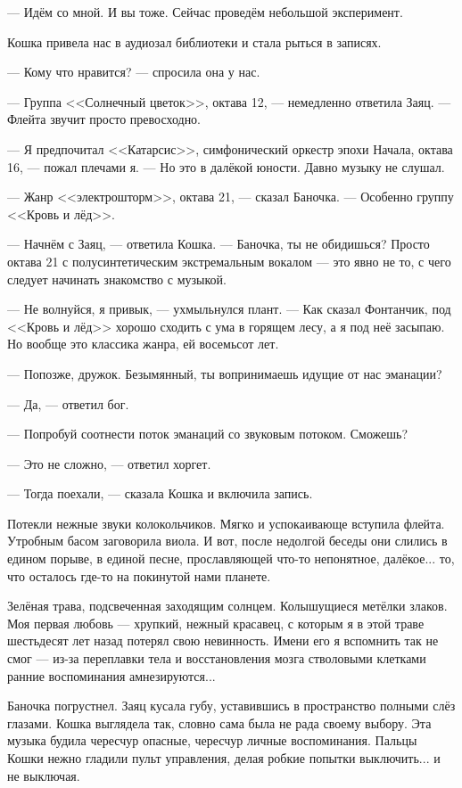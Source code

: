 --- Идём со мной.
И вы тоже.
Сейчас проведём небольшой эксперимент.

Кошка привела нас в аудиозал библиотеки и стала рыться в записях.

--- Кому что нравится? --- спросила она у нас.

--- Группа <<Солнечный цветок>>, октава 12, --- немедленно ответила Заяц.
--- Флейта звучит просто превосходно.

--- Я предпочитал <<Катарсис>>, симфонический оркестр эпохи Начала, октава 16, --- пожал плечами я.
--- Но это в далёкой юности.
Давно музыку не слушал.

--- Жанр <<электрошторм>>, октава 21, --- сказал Баночка.
--- Особенно группу <<Кровь и лёд>>.

--- Начнём с Заяц, --- ответила Кошка.
--- Баночка, ты не обидишься?
Просто октава 21 с полусинтетическим экстремальным вокалом --- это явно не то, с чего следует начинать знакомство с музыкой.

--- Не волнуйся, я привык, --- ухмыльнулся плант.
--- Как сказал Фонтанчик, под <<Кровь и лёд>> хорошо сходить с ума в горящем лесу, а я под неё засыпаю.
Но вообще это классика жанра, ей восемьсот лет.

--- Попозже, дружок.
Безымянный, ты вопринимаешь идущие от нас эманации?

--- Да, --- ответил бог.

--- Попробуй соотнести поток эманаций со звуковым потоком.
Сможешь?

--- Это не сложно, --- ответил хоргет.

--- Тогда поехали, --- сказала Кошка и включила запись.

Потекли нежные звуки колокольчиков.
Мягко и успокаивающе вступила флейта.
Утробным басом заговорила виола.
И вот, после недолгой беседы они слились в едином порыве, в единой песне, прославляющей что-то непонятное, далёкое... то, что осталось где-то на покинутой нами планете.

Зелёная трава, подсвеченная заходящим солнцем.
Колышущиеся метёлки злаков.
Моя первая любовь --- хрупкий, нежный красавец, с которым я в этой траве шестьдесят лет назад потерял свою невинность.
Имени его я вспомнить так не смог --- из-за переплавки тела и восстановления мозга стволовыми клетками ранние воспоминания амнезируются...

Баночка погрустнел.
Заяц кусала губу, уставившись в пространство полными слёз глазами.
Кошка выглядела так, словно сама была не рада своему выбору.
Эта музыка будила чересчур опасные, чересчур личные воспоминания.
Пальцы Кошки нежно гладили пульт управления, делая робкие попытки выключить... и не выключая.

